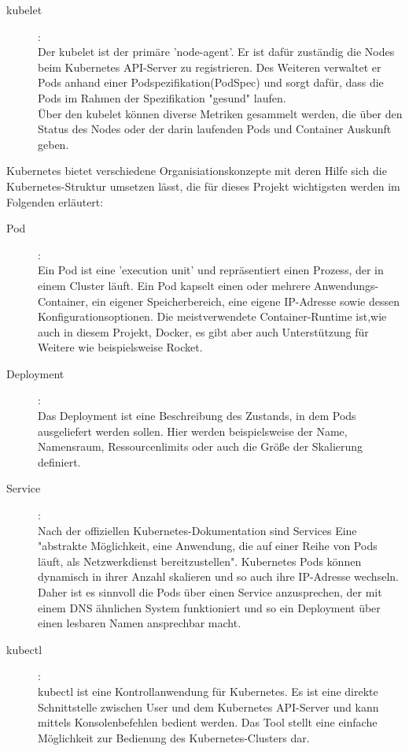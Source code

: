 \documentclass[a4paper,12pt]{scrartcl}
\begin{document}
\begin{description}

\item [kubelet]: \\
Der kubelet ist der primäre 'node-agent'. Er ist dafür zuständig die Nodes beim Kubernetes API-Server zu registrieren. Des Weiteren verwaltet er Pods anhand einer Podspezifikation(PodSpec) und sorgt dafür, dass die Pods im Rahmen der Spezifikation "gesund" laufen.\\
Über den kubelet können diverse Metriken gesammelt werden, die über den Status des Nodes oder der darin laufenden Pods und Container Auskunft geben.\\

\end{description}

Kubernetes bietet verschiedene Organisiationskonzepte mit deren Hilfe sich die Kubernetes-Struktur umsetzen lässt, die für dieses Projekt wichtigsten werden im Folgenden erläutert:

\begin{description}

\item [Pod]:\\
Ein Pod ist eine 'execution unit' und repräsentiert einen Prozess, der in einem Cluster läuft. Ein Pod kapselt einen oder mehrere Anwendungs-Container, ein eigener Speicherbereich, eine eigene IP-Adresse sowie dessen Konfigurationsoptionen.
Die meistverwendete Container-Runtime ist,wie auch in diesem Projekt, Docker, es gibt aber auch Unterstützung für Weitere wie beispielsweise Rocket.\\
\item [Deployment]:\\
Das Deployment ist eine Beschreibung des Zustands, in dem Pods ausgeliefert werden sollen. Hier werden beispielsweise der Name, Namensraum, Ressourcenlimits oder auch die Größe der Skalierung definiert.
\item [Service]:\\
Nach der offiziellen Kubernetes-Dokumentation sind Services Eine "abstrakte Möglichkeit, eine Anwendung, die auf einer Reihe von Pods läuft, als Netzwerkdienst bereitzustellen".
Kubernetes Pods können dynamisch in ihrer Anzahl skalieren und so auch ihre IP-Adresse wechseln. Daher ist es sinnvoll die Pods über einen Service anzusprechen, der mit einem DNS ähnlichen System funktioniert und so ein Deployment über einen lesbaren Namen ansprechbar macht. 
\item [kubectl]:\\
kubectl ist eine Kontrollanwendung für Kubernetes. Es ist eine direkte Schnittstelle zwischen User und dem Kubernetes API-Server und kann mittels Konsolenbefehlen bedient werden. Das Tool stellt eine einfache Möglichkeit zur Bedienung des Kubernetes-Clusters dar. \\

\end{description}
\end{document}
